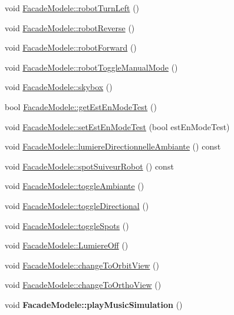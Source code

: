 \begin{DoxyCompactItemize}
void \hyperlink{group__inf2990_ga315a7219bfaadcf4b5667aa26e715a59}{Facade\-Modele\-::robot\-Turn\-Left} ()
\item 
void \hyperlink{group__inf2990_ga0337e81d62cf2a38aace4b6bc0a9056a}{Facade\-Modele\-::robot\-Reverse} ()
\item 
void \hyperlink{group__inf2990_ga7d7a91c04dd796ce9db41286868b092c}{Facade\-Modele\-::robot\-Forward} ()
\item 
void \hyperlink{group__inf2990_ga3e853c603a2393bbaf048b225eb47483}{Facade\-Modele\-::robot\-Toggle\-Manual\-Mode} ()
\item 
void \hyperlink{group__inf2990_gab070cb5e807e3d52e6471bca84da58c1}{Facade\-Modele\-::skybox} ()
\item 
bool \hyperlink{group__inf2990_ga1bfff8664184ba8ecabd7855617fc0a3}{Facade\-Modele\-::get\-Est\-En\-Mode\-Test} ()
\item 
void \hyperlink{group__inf2990_ga685064f7892c9404453742a670081054}{Facade\-Modele\-::set\-Est\-En\-Mode\-Test} (bool est\-En\-Mode\-Test)
\item 
void \hyperlink{group__inf2990_ga6db69b55af392317e9a3a38157ec0111}{Facade\-Modele\-::lumiere\-Directionnelle\-Ambiante} () const 
\item 
void \hyperlink{group__inf2990_ga2165572f1f551e98af72daee238bf2d7}{Facade\-Modele\-::spot\-Suiveur\-Robot} () const 
\item 
void \hyperlink{group__inf2990_ga2982ec28025802ed1d50e752911b5332}{Facade\-Modele\-::toggle\-Ambiante} ()
\item 
void \hyperlink{group__inf2990_gabd835b688aaf5353eae2487da5df4f4a}{Facade\-Modele\-::toggle\-Directional} ()
\item 
void \hyperlink{group__inf2990_ga3ac790567113a26aff4dcf7a614fa402}{Facade\-Modele\-::toggle\-Spots} ()
\item 
void \hyperlink{group__inf2990_ga5f241684ec0114d116c6fcaff54ee85f}{Facade\-Modele\-::\-Lumiere\-Off} ()
\item 
void \hyperlink{group__inf2990_ga8a0651f21346a7c43bede2fc68a7e0cf}{Facade\-Modele\-::change\-To\-Orbit\-View} ()
\item 
void \hyperlink{group__inf2990_gad4818ae5a5280686ee88729cf2423199}{Facade\-Modele\-::change\-To\-Ortho\-View} ()
\item 
\hypertarget{group__inf2990_ga98a0ea63d3251c1ca9d83dddd76cab58}{void {\bfseries Facade\-Modele\-::play\-Music\-Simulation} ()}\label{group__inf2990_ga98a0ea63d3251c1ca9d83dddd76cab58}


\end{DoxyCompactItemize}
